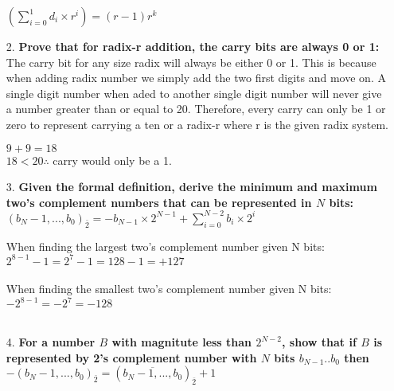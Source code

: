 \documentclass{article}
\begin{document}
\begin{enumerate}
			$(\sum_{i=0}^{1}d_i\times r^i) = (r - 1)r^k$ \\
			

		\item[2.] %
			\textbf{Prove that for radix-r addition, the carry bits are always 0 or 1:} \\
			The carry bit for any size radix will always be either 0 or 1. This is because when adding radix number we simply add the two first digits and move on. A single digit number when aded to another single digit number will never give a number greater than or equal to 20. Therefore, every carry can only be 1 or zero to represent carrying a ten or a radix-r where r is the given radix system. \\

			\begin{center}
				$ 9 + 9 = 18$ \\
				$ 18 < 20 \therefore$ carry would only be a 1.
			\end{center}

		\label{3}\item[3.] %
		\textbf{Given the formal definition, derive the minimum and maximum two's complement numbers that can be represented in $N$ bits:} \\

			$(b_N-1,...,b_0)_{\bar{2}} = -b_{N-1} \times 2^{N-1} + \sum_{i=0}^{N-2}b_i \times 2^i$ \\

			\begin{center}
				When finding the largest two's complement number given N bits:  \\
				$2^{8-1} - 1 = 2^7 - 1 = 128 - 1 = +127$ \\
				 \\	

				When finding the smallest two's complement number given N bits:  \\
				$-2^{8-1} = -2^7 = -128$ \\
				 \\
			\end{center}
		
		\item[4.] %
		\textbf{For a number $B$ with magnitute less than $2^{N - 2}$, show that if $B$ is represented by 2's complement number with $N$ bits $b_{N-1}..b_0$ then $-(b_N-1,...,b_0)_{\bar{2}} = (\overline{b_N-1,...,b_0})_{\bar{2}}+1$ } \\


\end{enumerate}
\end{document}
